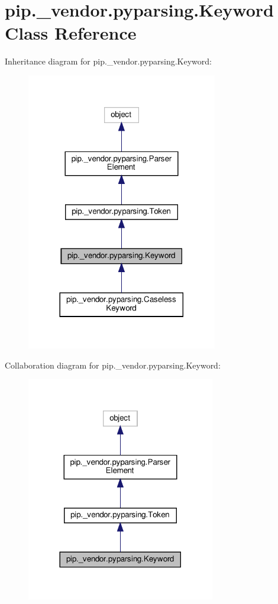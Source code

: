 \hypertarget{classpip_1_1__vendor_1_1pyparsing_1_1Keyword}{}\section{pip.\+\_\+vendor.\+pyparsing.\+Keyword Class Reference}
\label{classpip_1_1__vendor_1_1pyparsing_1_1Keyword}


Inheritance diagram for pip.\+\_\+vendor.\+pyparsing.\+Keyword\+:
\nopagebreak
\begin{figure}[H]
\begin{center}
\leavevmode
\includegraphics[width=236pt]{classpip_1_1__vendor_1_1pyparsing_1_1Keyword__inherit__graph}
\end{center}
\end{figure}


Collaboration diagram for pip.\+\_\+vendor.\+pyparsing.\+Keyword\+:
\nopagebreak
\begin{figure}[H]
\begin{center}
\leavevmode
\includegraphics[width=233pt]{classpip_1_1__vendor_1_1pyparsing_1_1Keyword__coll__graph}
\end{center}
\end{figure}
